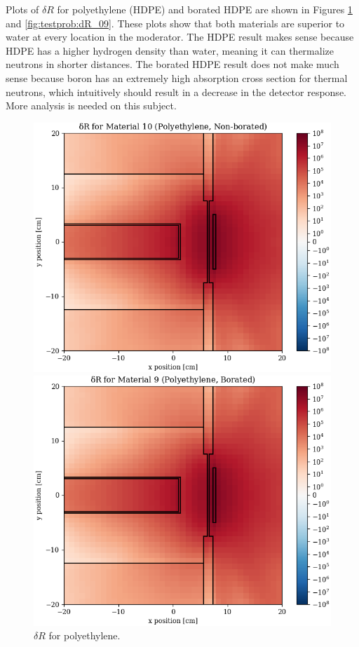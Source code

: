 Plots of $\delta R$ for polyethylene (HDPE) and borated HDPE are shown in Figures \ref{fig:testprob:dR_10} and \ref{fig:testprob:dR_09}.
These plots show that both materials are superior to water at every location in the moderator.
The HDPE result makes sense because HDPE has a higher hydrogen density than water, meaning it can thermalize neutrons in shorter distances.
The borated HDPE result does not make much sense because boron has an extremely high absorption cross section for thermal neutrons, which intuitively should result in a decrease in the detector response.
More analysis is needed on this subject.

\begin{figure}
  \begin{minipage}{0.49\linewidth}
    \centering
    \includegraphics[width=\linewidth]{content/testprob/dR_10.png}
    \caption{$\delta R$ for polyethylene.}
    \label{fig:testprob:dR_10}
  \end{minipage}
  \hfill
  \begin{minipage}{0.49\linewidth}
    \centering
    \includegraphics[width=\linewidth]{content/testprob/dR_09.png}

\end{minipage}
\end{figure}
